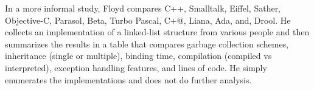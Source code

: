 \documentclass{article}
\begin{document}
In a more informal study, Floyd compares C++, Smalltalk, Eiffel, Sather,
Objective-C, Parasol, Beta, Turbo Pascal, C+@, Liana, Ada, and, Drool.  He
collects an implementation of a linked-list structure from various people and
then summarizes the results in a table that compares garbage collection schemes,
inheritance (single or multiple), binding time, compilation (compiled vs
interpreted), exception handling features, and lines of code.  He simply
enumerates the implementations and does not do further analysis.



\end{document}
